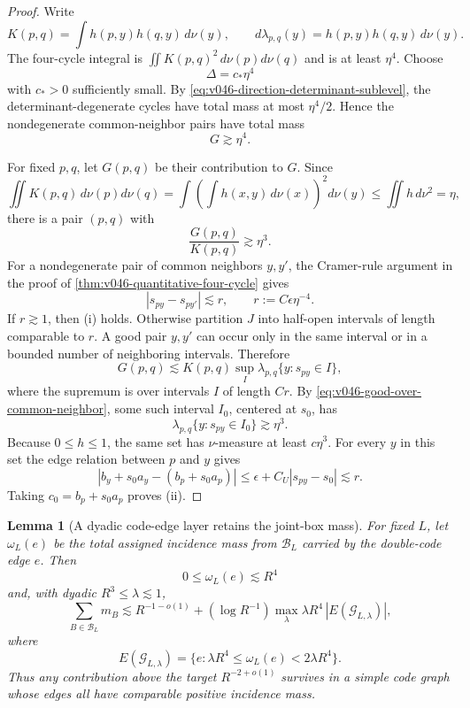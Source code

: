 \documentclass[10pt]{article}
\newtheorem{lemma}[theorem]{Lemma}
\begin{document}
\begin{proof}
Write
\[
K(p,q)=\int h(p,y)h(q,y)\,d\nu(y),
\qquad
d\lambda_{p,q}(y)=h(p,y)h(q,y)\,d\nu(y).
\]
The four-cycle integral is
\(
\iint K(p,q)^2\,d\nu(p)d\nu(q)
\)
and is at least \(\eta^4\).  Choose
\[
\Delta=c_*\eta^4
\]
with \(c_*>0\) sufficiently small.  By
\eqref{eq:v046-direction-determinant-sublevel}, the determinant-degenerate cycles have total mass
at most \(\eta^4/2\).  Hence the nondegenerate common-neighbor pairs have total mass
\begin{equation}
\label{eq:v046-good-common-neighbor-mass}
G\gtrsim\eta^4.
\end{equation}

For fixed \(p,q\), let \(G(p,q)\) be their contribution to \(G\).  Since
\[
\iint K(p,q)\,d\nu(p)d\nu(q)
=\int\left(\int h(x,y)\,d\nu(x)\right)^2d\nu(y)
\le\iint h\,d\nu^2
=\eta,
\]
there is a pair \((p,q)\) with
\begin{equation}
\label{eq:v046-good-over-common-neighbor}
\frac{G(p,q)}{K(p,q)}\gtrsim\eta^3.
\end{equation}
For a nondegenerate pair of common neighbors \(y,y'\), the Cramer-rule argument in the proof of
\cref{thm:v046-quantitative-four-cycle} gives
\[
|s_{py}-s_{py'}|
\lesssim
r,
\qquad
r:=C\epsilon\eta^{-4}.
\]
If \(r\gtrsim1\), then (i) holds.  Otherwise partition \(J\) into half-open intervals of length
comparable to \(r\).  A good pair \(y,y'\) can occur only in the same interval or in a bounded
number of neighboring intervals.  Therefore
\[
G(p,q)
\lesssim
K(p,q)
\sup_I\lambda_{p,q}\{y:s_{py}\in I\},
\]
where the supremum is over intervals \(I\) of length \(Cr\).  By
\eqref{eq:v046-good-over-common-neighbor}, some such interval \(I_0\), centered at \(s_0\), has
\[
\lambda_{p,q}\{y:s_{py}\in I_0\}
\gtrsim\eta^3.
\]
Because \(0\le h\le1\), the same set has \(\nu\)-measure at least \(c\eta^3\).  For every \(y\) in
this set the edge relation between \(p\) and \(y\) gives
\[
|b_y+s_0a_y-(b_p+s_0a_p)|
\le
\epsilon+C_U|s_{py}-s_0|
\lesssim r.
\]
Taking \(c_0=b_p+s_0a_p\) proves (ii).
\end{proof}

\begin{lemma}[A dyadic code-edge layer retains the joint-box mass]
\label{lem:v046-weighted-code-edge-layer}
For fixed \(L\), let \(\omega_L(e)\) be the total assigned incidence mass from
\(\mathcal B_L\) carried by the double-code edge \(e\).  Then
\[
0\le\omega_L(e)\lesssim R^4
\]
and, with dyadic \(R^3\le\lambda\lesssim1\),
\begin{equation}
\label{eq:v046-weighted-code-layer}
\boxed{
\sum_{B\in\mathcal B_L}m_B
\lesssim
R^{-1-o(1)}
+
(\log R^{-1})
\max_\lambda
\lambda R^4\,|E(\mathscr G_{L,\lambda})|,
}
\end{equation}
where
\[
E(\mathscr G_{L,\lambda})
=
\{e:\lambda R^4\le\omega_L(e)<2\lambda R^4\}.
\]
Thus any contribution above the target \(R^{-2+o(1)}\) survives in a simple code graph whose edges
all have comparable positive incidence mass.
\end{lemma}
\end{document}
